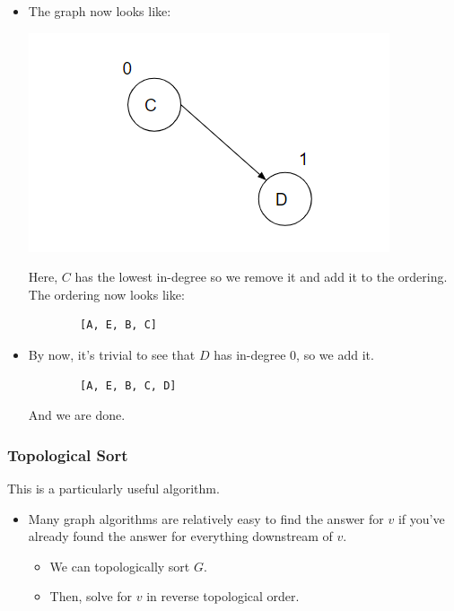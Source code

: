 \documentclass[letterpaper]{article}
\begin{document}
\begin{itemize}
\begin{center}
    \end{center}
    Here, note that $B$ is the only node with the lowest in-degree. So, we remove it and add it to the ordering. The ordering now looks like: 
    \begin{verbatim}
        [A, E, B]
    \end{verbatim}
    \item The graph now looks like:
    \begin{center}
        \includegraphics[scale=0.4]{assets/dag_ex_deg_4.png}
    \end{center}
    Here, $C$ has the lowest in-degree so we remove it and add it to the ordering. The ordering now looks like: 
    \begin{verbatim}
        [A, E, B, C]
    \end{verbatim}
    \item By now, it's trivial to see that $D$ has in-degree 0, so we add it.
    \begin{verbatim}
        [A, E, B, C, D]
    \end{verbatim}
    And we are done. 
\end{itemize}

\subsubsection{Topological Sort}
This is a particularly useful algorithm. 
\begin{itemize}
    \item Many graph algorithms are relatively easy to find the answer for $v$ if you've already found the answer for everything downstream of $v$. 
    \begin{itemize}
        \item We can topologically sort $G$. 
        \item Then, solve for $v$ in reverse topological order.
    \end{itemize}
\end{itemize}
\end{document}
